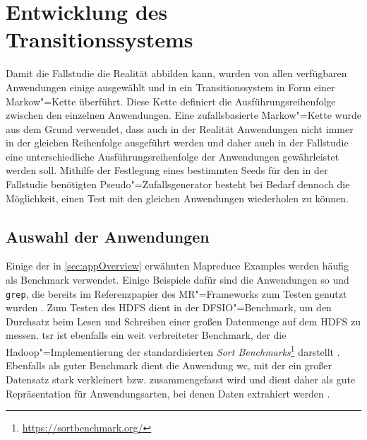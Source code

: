 \section{Entwicklung des Transitionssystems}
\label{sec:transitionsystem}

Damit die Fallstudie die Realität abbilden kann, wurden von allen verfügbaren Anwendungen einige ausgewählt und in ein Transitionssystem in Form einer Markow"=Kette überführt.
Diese Kette definiert die Ausführungsreihenfolge zwischen den einzelnen Anwendungen.
Eine zufallsbasierte Markow"=Kette wurde aus dem Grund verwendet, dass auch in der Realität Anwendungen nicht immer in der gleichen Reihenfolge ausgeführt werden und daher auch in der Fallstudie eine unterschiedliche Ausführungsreihenfolge der Anwendungen gewährleistet werden soll.
Mithilfe der Festlegung eines bestimmten Seeds für den in der Fallstudie benötigten Pseudo"=Zufallsgenerator besteht bei Bedarf dennoch die Möglichkeit, einen Test mit den gleichen Anwendungen wiederholen zu können.

\subsection{Auswahl der Anwendungen}
\label{subsec:appSelection}

Einige der in \cref{sec:appOverview} erwähnten Mapreduce Examples werden häufig als Benchmark verwendet.
Einige Beispiele dafür sind die Anwendungen \acl{so} und \texttt{grep}, die bereits im Referenzpapier des \ac{MR}"=Frameworks zum Testen genutzt wurden \cite{Dean2004}.
Zum Testen des \ac{HDFS} dient in \cite{Shvachko2010} der DFSIO"=Benchmark, um den Durchsatz beim Lesen und Schreiben einer großen Datenmenge auf dem \ac{HDFS} zu messen.
\acl{tsr} ist ebenfalls ein weit verbreiteter Benchmark, der die Hadoop"=Implementierung der standardisierten \emph{Sort Benchmarks}\footnote{\url{https://sortbenchmark.org/}} darstellt \cite{Graves2013}.
Ebenfalls als guter Benchmark dient die Anwendung \acl{wc}, mit der ein großer Datensatz stark verkleinert bzw. zusammengefasst wird und dient daher als gute Repräsentation für Anwendungsarten, bei denen Daten extrahiert werden \cite{Huang2010,Chen2012}.

